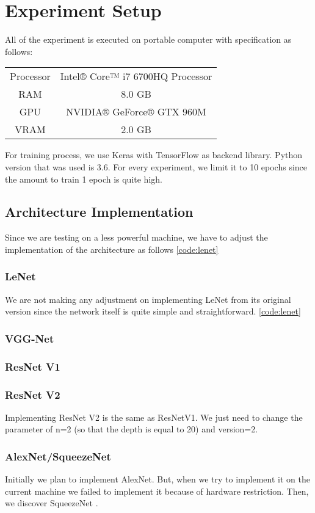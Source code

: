 \section{Experiment Setup}
All of the experiment is executed on portable computer with specification as follows:
\begin{center}
	\begin{tabular}{| c| c| }
		Processor & Intel® Core™ i7 6700HQ Processor\\ 
		RAM & 8.0 GB \\  
		GPU & NVIDIA® GeForce® GTX 960M \\
		VRAM & 2.0 GB     
	\end{tabular}
\end{center}

For training process, we use Keras with TensorFlow as backend library. Python version that was used is 3.6. For every experiment, we limit it to 10 epochs since the amount to train 1 epoch is quite high.

\subsection{Architecture Implementation}
Since we are testing on a less powerful machine, we have to adjust the implementation of the architecture as follows \ref{code:lenet}
\subsubsection{LeNet}
We are not making any adjustment on implementing LeNet from its original version since the network itself is quite simple and straightforward. 
\ref{code:lenet}
\subsubsection{VGG-Net}

\subsubsection{ResNet V1}

\subsubsection{ResNet V2}
Implementing ResNet V2 is the same as ResNetV1. We just need to change the parameter of n=2 (so that the depth is equal to 20) and version=2.
\subsubsection{AlexNet/SqueezeNet}
Initially we plan to implement AlexNet. But, when we try to implement it on the current machine we failed to implement it because of hardware restriction. Then, we discover SqueezeNet \cite{SqueezeNet}.


